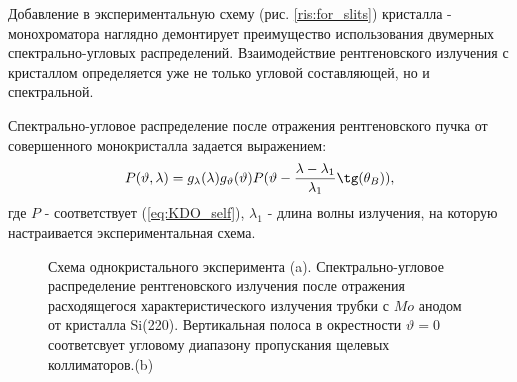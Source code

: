\label{sec:single_crystal_section}

  Добавление в экспериментальную схему (рис. \ref{ris:for_slits}) кристалла - монохроматора
  наглядно демонтирует преимущество использования двумерных спектрально-угловых распределений.
Взаимодействие рентгеновского излучения с кристаллом определяется уже не только
угловой составляющей, но и спектральной.

  Спектрально-угловое распределение после отражения рентгеновского пучка от
  совершенного монокристалла задается выражением:
  \begin{equation} \label{eq:monochromator_spectra}
    P(\vartheta,\lambda) = g_{\lambda}(\lambda)g_{\vartheta}(\vartheta) P(\vartheta - \frac{\lambda - \lambda_1}{\lambda_1}\tg(\theta_B)),
   \end{equation}
где $P$ - соответствует (\ref{eq:KDO_self}), $\lambda_1$ - длина волны излучения, на которую
настраивается экспериментальная схема.

\begin{figure}[H]
  \centering
  \hfill

  \caption{Схема однокристального эксперимента (a). Спектрально-угловое распределение
  рентгеновского излучения после отражения расходящегося характеристического излучения
  трубки с $Mo$ анодом от кристалла Si(220). Вертикальная полоса в окрестности
  $\vartheta = 0$ соответсвует угловому диапазону пропускания щелевых коллиматоров.(b)}
  \label{ris:single_crystal_schem_lamtet}
\end{figure}

